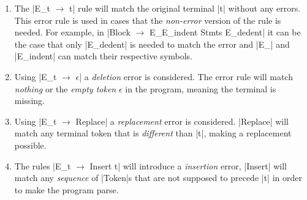 \begin{enumerate}
  \item The |E_t $\rightarrow$ t| rule will match the original terminal |t| without any
  errors. This error rule is used in cases that the \emph{non-error} version of
  the rule is needed. For example, in \break
  |Block $\rightarrow$ E_\n E_indent Stmts E_dedent| it can be the case that only
  |E_dedent| is needed to match the error and |E_\n| and |E_indent| can match
  their respective symbols.
  \item Using |E_t $\rightarrow$ $\epsilon$| a \emph{deletion} error is considered. The
  error rule will match \emph{nothing} or the \emph{empty token} $\epsilon$ in
  the program, meaning the terminal is missing.
  \item Using |E_t $\rightarrow$ Replace| a \emph{replacement} error is considered.
  |Replace| will match any terminal token that is \emph{different} than |t|,
  making a replacement possible.
  \item  The rules |E_t $\rightarrow$ Insert t| will introduce a \emph{insertion} error,
  \ie |Insert| will match any \emph{sequence} of |Token|s that are not supposed
  to precede |t| in order to make the program parse.
\end{enumerate}
